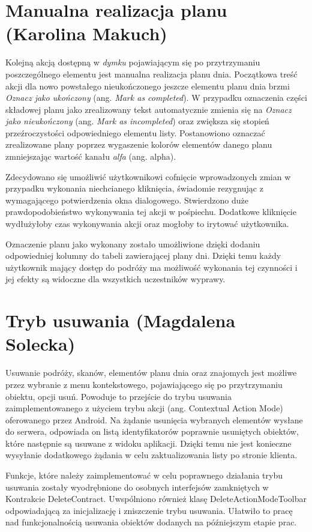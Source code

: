 \section{Manualna realizacja planu (Karolina Makuch)}
\par  Kolejną akcją dostępną w \textit{dymku} pojawiającym się po przytrzymaniu poszczególnego elementu jest manualna realizacja planu dnia. Początkowa treść akcji dla nowo powstałego nieukończonego jeszcze elementu planu dnia brzmi \textit{Oznacz jako ukończony} (ang. \textit{Mark as completed}). W przypadku oznaczenia części składowej planu jako zrealizowany tekst automatycznie zmienia się na \textit{Oznacz jako nieukończony} (ang. \textit{Mark as incompleted}) oraz zwiększa się stopień przeźroczystości odpowiedniego elementu listy. Postanowiono oznaczać zrealizowane plany poprzez wygaszenie kolorów elementów danego planu zmniejszając wartość kanału \textit{alfa} (ang. alpha).
 \par Zdecydowano się umożliwić użytkownikowi cofnięcie wprowadzonych zmian w przypadku wykonania niechcianego kliknięcia, świadomie rezygnując z wymagającego potwierdzenia okna dialogowego. Stwierdzono duże prawdopodobieństwo wykonywania tej akcji w pośpiechu. Dodatkowe kliknięcie wydłużyłoby czas wykonywania akcji oraz mogłoby to irytować użytkownika.
\par  Oznaczenie planu jako wykonany zostało umożliwione dzięki dodaniu odpowiedniej kolumny do tabeli zawierającej plany dni. Dzięki temu każdy użytkownik mający dostęp do podróży ma możliwość wykonania tej czynności i jej efekty są widoczne dla wszystkich uczestników wyprawy.

\section{Tryb usuwania (Magdalena Solecka)}
\par Usuwanie podróży, skanów, elementów planu dnia oraz znajomych jest możliwe przez wybranie z menu kontekstowego, pojawiającego się po przytrzymaniu obiektu, opcji usuń. Powoduje to przejście do trybu usuwania zaimplementowanego z użyciem trybu akcji (ang. Contextual Action Mode)\cite{contextualActionMode} oferowanego przez Android. Na żądanie usunięcia wybranych elementów wysłane do serwera, odpowiada on listą identyfikatorów poprawnie usuniętych  obiektów, które następnie są usuwane z widoku aplikacji. Dzięki temu nie jest konieczne wysyłanie dodatkowego żądania w celu zaktualizowania listy po stronie klienta.
\par Funkcje, które należy zaimplementować w celu poprawnego działania trybu usuwania zostały wyodrębnione do osobnych interfejsów zamkniętych w Kontrakcie DeleteContract. Uwspólniono również klasę DeleteActionModeToolbar odpowiadającą za inicjalizację i zniszczenie trybu usuwania. Ułatwiło to pracę nad funkcjonalnością usuwania obiektów dodanych na późniejszym etapie prac.
